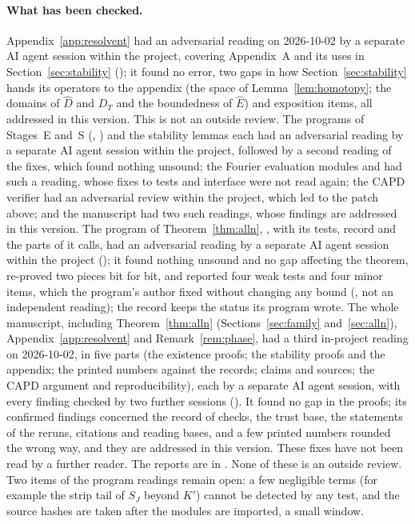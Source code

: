 \documentclass[11pt]{article}
\theoremstyle{definition}
\begin{document}
\paragraph{What has been checked.} Appendix~\ref{app:resolvent} had an adversarial reading on 2026-10-02 by a separate AI agent session within the project, covering Appendix~A and its uses in Section~\ref{sec:stability} (); it found no error, two gaps in how Section~\ref{sec:stability} hands its operators to the appendix (the space of Lemma~\ref{lem:homotopy}; the domains of $\hat D$ and $D_T$ and the boundedness of $\hat E$) and exposition items, all addressed in this version. This is not an outside review. The programs of Stages~E and~S (, ) and the stability lemmas each had an adversarial reading by a separate AI agent session within the project, followed by a second reading of the fixes, which found nothing unsound; the Fourier evaluation modules  and  had such a reading, whose fixes to tests and interface were not read again; the CAPD verifier had an adversarial review within the project, which led to the patch above; and the manuscript had two such readings, whose findings are addressed in this version. The program of Theorem~\ref{thm:alln}, , with its tests, record and the parts of  it calls, had an adversarial reading by a separate AI agent session within the project (); it found nothing unsound and no gap affecting the theorem, re-proved two pieces bit for bit, and reported four weak tests and four minor items, which the program's author fixed without changing any bound (, not an independent reading); the record keeps the status its program wrote. The whole manuscript, including Theorem~\ref{thm:alln} (Sections~\ref{sec:family} and~\ref{sec:alln}), Appendix~\ref{app:resolvent} and Remark~\ref{rem:phase}, had a third in-project reading on 2026-10-02, in five parts (the existence proofs; the stability proofs and the appendix; the printed numbers against the records; claims and sources; the CAPD argument and reproducibility), each by a separate AI agent session, with every finding checked by two further sessions (). It found no gap in the proofs; its confirmed findings concerned the record of checks, the trust base, the statements of the reruns, citations and reading bases, and a few printed numbers rounded the wrong way, and they are addressed in this version. These fixes have not been read by a further reader. The reports are in . None of these is an outside review. Two items of the program readings remain open: a few negligible terms (for example the strip tail of $S_J$ beyond $K'$) cannot be detected by any test, and the source hashes are taken after the modules are imported, a small window.
\end{document}
